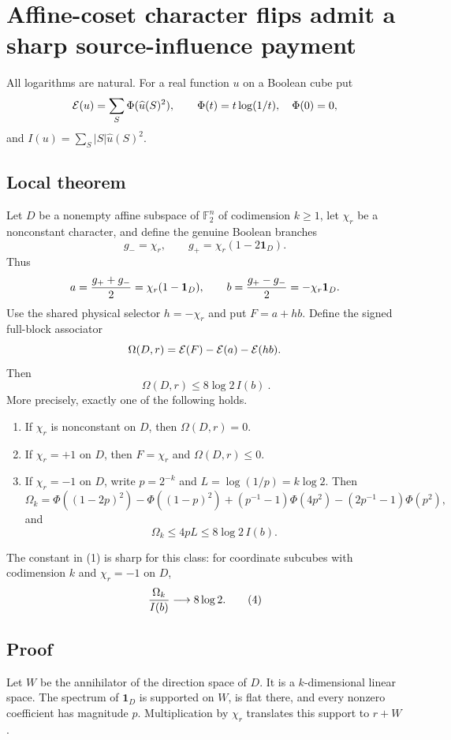 \section*{Affine-coset character flips admit a sharp source-influence payment}

All logarithms are natural.  For a real function $u$ on a Boolean cube put
\[
  {\cal E}(u)=\sum_S \Phi(\widehat u(S)^2),\qquad
  \Phi(t)=t\log(1/t),\quad \Phi(0)=0,
\]
and $I(u)=\sum_S |S|\widehat u(S)^2$.

\subsection*{Local theorem}
Let $D$ be a nonempty affine subspace of $\mathbb F_2^n$ of codimension
$k\geq 1$, let $\chi_r$ be a nonconstant character, and define the genuine
Boolean branches
\[
 g_- = \chi_r,\qquad g_+=\chi_r(1-2\mathbf 1_D).
\]
Thus
\[
 a={g_++g_-\over2}=\chi_r(1-\mathbf 1_D),\qquad
 b={g_+-g_-\over2}=-\chi_r\mathbf 1_D.
\]
Use the shared physical selector $h=-\chi_r$ and put $F=a+hb$.  Define the
signed full-block associator
\[
 \Omega(D,r)={\cal E}(F)-{\cal E}(a)-{\cal E}(hb).
\]
Then
\[
 \boxed{\ \Omega(D,r)\leq 8\log 2\,I(b)\ } .                    \tag{1}
\]
More precisely, exactly one of the following holds.

\begin{enumerate}
\item If $\chi_r$ is nonconstant on $D$, then $\Omega(D,r)=0$.
\item If $\chi_r=+1$ on $D$, then $F=\chi_r$ and $\Omega(D,r)\leq0$.
\item If $\chi_r=-1$ on $D$, write $p=2^{-k}$ and $L=\log(1/p)=k\log2$.
Then
\[
 \Omega_k=\Phi((1-2p)^2)-\Phi((1-p)^2)
 +(p^{-1}-1)\Phi(4p^2)-(2p^{-1}-1)\Phi(p^2),                 \tag{2}
\]
and
\[
 \Omega_k\leq 4pL\leq8\log2\,I(b).                          \tag{3}
\]
\end{enumerate}

The constant in (1) is sharp for this class: for coordinate subcubes with
codimension $k$ and $\chi_r=-1$ on $D$,
\[
 {\Omega_k\over I(b)}\longrightarrow 8\log2.                \tag{4}
\]

\subsection*{Proof}
Let $W$ be the annihilator of the direction space of $D$.  It is a
$k$-dimensional linear space.  The spectrum of $\mathbf1_D$ is supported on
$W$, is flat there, and every nonzero coefficient has magnitude $p$.
Multiplication by $\chi_r$ translates this support to $r+W$.

